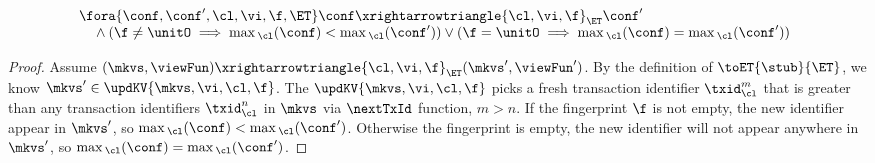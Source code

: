 \begin{lemma}
\label{lem:kv-max-cl}
\[
\begin{array}{@{}l}
    \fora{\conf, \conf' ,\cl, \vi, \f, \ET}
    \conf \xrightarrowtriangle{\cl, \vi, \f}_{\ET}  \conf' \\
    \quad {} \land ( \f \neq \unitO \implies \max{}_\cl(\conf) < \max{}_\cl(\conf') ) \lor ( \f = \unitO \implies \max{}_\cl(\conf) = \max{}_\cl(\conf') )
\end{array}
\]
\end{lemma}
\begin{proof}
    Assume  \( (\mkvs, \viewFun) \xrightarrowtriangle{\cl, \vi, \f}_{\ET} (\mkvs', \viewFun') \).
    By the definition of \( \toET{\stub}{\ET}\), we know \( \mkvs' \in \updKV{\mkvs, \vi, \cl, \f} \).
    The \( \updKV{\mkvs, \vi, \cl, \f} \) picks a fresh transaction identifier \( \txid_\cl^{m} \) that is greater than any transaction identifiers \( \txid_\cl^{n} \) in \( \mkvs \) via \( \nextTxId \) function, \ie \( m > n \).
    If the fingerprint \( \f \) is not empty, the new identifier appear in \( \mkvs' \), so \( \max{}_\cl(\conf) < \max{}_\cl(\conf') \).
    Otherwise  the fingerprint is empty, the new identifier will not appear anywhere in \( \mkvs' \), so \( \max{}_\cl(\conf) = \max{}_\cl(\conf') \). 
\end{proof}

